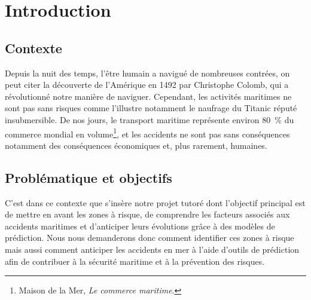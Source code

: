 \documentclass[12pt, a4paper]{report}
\renewcommand{\headrulewidth}{0.4pt}
\renewcommand{\footrulewidth}{0.5pt}
\renewcommand{\headrulewidth}{0.4pt}
\renewcommand{\footrulewidth}{0.5pt}
\renewcommand{\headrulewidth}{0pt}
\renewcommand{\footrulewidth}{0pt}
\begin{document}
\pagestyle{empty}

{%
  \fancypagestyle{plain}{
    \fancyhf{}
    \renewcommand{\headrulewidth}{0pt}
    \renewcommand{\footrulewidth}{0pt}
  }
  \tableofcontents
}

\clearpage

\pagestyle{fancy}
\setcounter{page}{1}


\pagestyle{fancy}
\setcounter{page}{1}


\chapter{Introduction}
\thispagestyle{plain}

\section{Contexte}

Depuis la nuit des temps, l'être humain a navigué de nombreuses contrées, on peut citer la découverte de l'Amérique en 1492 par Christophe Colomb, qui a révolutionné notre manière de naviguer. Cependant, les activités maritimes ne sont pas sans risques comme l'illustre notamment le naufrage du Titanic réputé insubmersible. De nos jours, le transport maritime représente environ 80~\% du commerce mondial en volume\footnote{Maison de la Mer, \textit{Le commerce maritime}.}, et les accidents ne sont pas sans conséquences notamment des conséquences économiques et, plus rarement, humaines.

\section{Problématique et objectifs}

C'est dans ce contexte que s'insère notre projet tutoré dont l'objectif principal est de mettre en avant les zones à risque, de comprendre les facteurs associés aux accidents maritimes et d'anticiper leurs évolutions grâce à des modèles de prédiction. Nous nous demanderons donc comment identifier ces zones à risque mais aussi comment anticiper les accidents en mer à l'aide d'outils de prédiction afin de contribuer à la sécurité maritime et à la prévention des risques.
\end{document}
